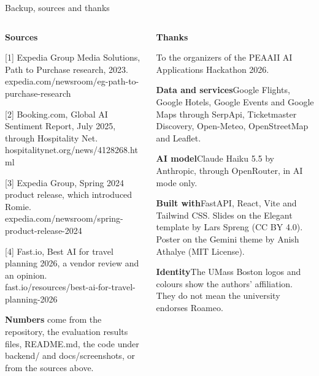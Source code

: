 \documentclass[
t,11pt,notheorems,usepdftitle=false,hyperref={pdfauthor={Zhen Lu, Noctis Zhang and Zhen Luo},pdftitle={Roameo plans your trip and lets you decide on the money},pdfsubject={Seven minute project presentation}}
]{beamer}
\begin{document}
\begin{frame}{Backup, sources and thanks}
  \begin{columns}[T, totalwidth=\textwidth]
    \begin{column}{0.49\textwidth}
      {\normalsize\bfseries Sources\par}
      \vspace{1.5mm}
      {\normalsize
      [1] Expedia Group Media Solutions, Path to Purchase research, 2023.\\ {\small\color{muted}expedia.com/newsroom/eg-path-to-purchase-research}\par\vspace{4.6mm}
      [2] Booking.com, Global AI Sentiment Report, July 2025, through Hospitality Net.\\ {\small\color{muted}hospitalitynet.org/news/4128268.html}\par\vspace{4.6mm}
      [3] Expedia Group, Spring 2024 product release, which introduced Romie.\\ {\small\color{muted}expedia.com/newsroom/spring-product-release-2024}\par\vspace{4.6mm}
      [4] Fast.io, Best AI for travel planning 2026, a vendor review and an opinion.\\ {\small\color{muted}fast.io/resources/best-ai-for-travel-planning-2026}\par\vspace{4.6mm}
      \textbf{Numbers} come from the repository, the evaluation results files, README.md, the code under backend/ and docs/screenshots, or from the sources above.\par}
    \end{column}
    \begin{column}{0.49\textwidth}
      {\normalsize\bfseries Thanks\par}
      \vspace{1.5mm}
      {\normalsize
      To the organizers of the PEAAII AI Applications Hackathon 2026.\par\vspace{4.6mm}
      \textbf{Data and services}\enspace Google Flights, Google Hotels, Google Events and Google Maps through SerpApi, Ticketmaster Discovery, Open-Meteo, OpenStreetMap and Leaflet.\par\vspace{4.6mm}
      \textbf{AI model}\enspace Claude Haiku 5.5 by Anthropic, through OpenRouter, in AI mode only.\par\vspace{4.6mm}
      \textbf{Built with}\enspace FastAPI, React, Vite and Tailwind CSS. Slides on the Elegant template by Lars Spreng (CC BY 4.0). Poster on the Gemini theme by Anish Athalye (MIT License).\par\vspace{4.6mm}
      \textbf{Identity}\enspace The UMass Boston logos and colours show the authors' affiliation. They do not mean the university endorses Roameo.\par}
    \end{column}
  \end{columns}
\end{frame}
\end{document}

